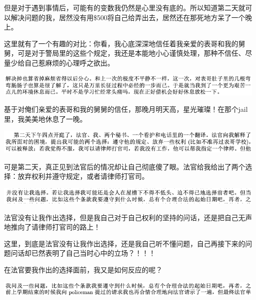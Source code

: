 \documentclass[9pt, b5paper]{article}
\begin{document}
但是对于遇到事情后，可能有的变数我仍然是心里没有底的。所以知道第二天就可以解决问题的我，居然没有用\$500将自己给弄出去，居然还在那死地方呆了一个晚上。

这里就有了一个有趣的对比：你看，我心底深深地信任着我亲爱的表哥和我的舅舅，可是对于警局里的这些个规定，我还是本能地小心谨慎处理，那种不信任、尽量少给自己惹麻烦的心理呼之欲出。  

\begin{center}
\includegraphics[width=.9\linewidth]{./pic/backups_plans_20210506_084440.png}
\end{center}

基于对俺们亲爱的表哥和我的舅舅的信任，那晚月明天高，星光璀璨！在那个jail里，我美美地休息了一晚。

\begin{center}
\includegraphics[width=.9\linewidth]{./pic/backups_plans_20210506_084539.png}
\end{center}

可是第二天，真正见到法官后的情况却让自己彻底傻了眼。法官给我给出了两个选择：放弃权利并遵守规定，或者请律师打官司。 

\begin{center}
\includegraphics[width=.9\linewidth]{./pic/backups_plans_20210506_084705.png}
\end{center}

法官没有让我作出选择，但是我自己对于自己权利的坚持的问话，还是把自己无声地推向了请律师打官司的路上！

这里，到底是法官没有让我作出选择，还是我自己听不懂问题，自己再接下来的问题问话却已然表明了自己当时心中的立场？！！！

在法官要我作出的选择面前，我又是如何反应的呢？

\begin{center}
\includegraphics[width=.9\linewidth]{./pic/backups_plans_20210506_084619.png}
\end{center}
\end{document}
